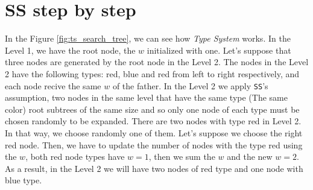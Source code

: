 \section{SS step by step}
\noindent
In the Figure \ref{fig:ts_search_tree}, we can see how \textit{Type System} works. In the Level 1, we have the root node, the $w$ initialized with one. Let's suppose that three nodes are generated by the root node in the Level 2. The nodes in the Level 2 have the following types: red, blue and red from left to right respectively, and each node recive the same $w$ of the father. In the Level 2 we apply \texttt{SS}'s assumption, two nodes in the same level that have the same type (The same color) root subtrees of the same size and so only one node of each type must be chosen randomly to be expanded. There are two nodes with type red in Level 2. In that way, we choose randomly one of them. Let's suppose we choose the right red node. Then, we have to update the number of nodes with the type red using the $w$, both red node types have $w=1$, then we sum the $w$ and the new $w=2$. As a result, in the Level 2 we will have two nodes of red type and one node with blue type. \\

